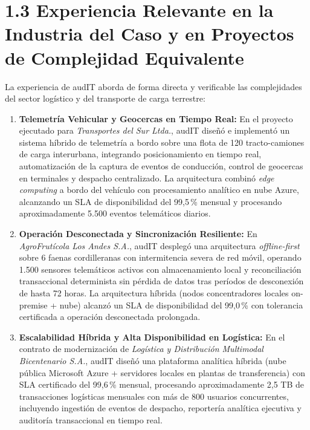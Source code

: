 \section{1.3 Experiencia Relevante en la Industria del Caso y en Proyectos de Complejidad Equivalente}

La experiencia de audIT aborda de forma directa y verificable las complejidades del sector logístico y del transporte de carga terrestre:

\begin{enumerate}
    \item \textbf{Telemetría Vehicular y Geocercas en Tiempo Real:} En el proyecto ejecutado para \emph{Transportes del Sur Ltda.}, audIT diseñó e implementó un sistema híbrido de telemetría a bordo sobre una flota de 120 tracto-camiones de carga interurbana, integrando posicionamiento en tiempo real, automatización de la captura de eventos de conducción, control de geocercas en terminales y despacho centralizado. La arquitectura combinó \emph{edge computing} a bordo del vehículo con procesamiento analítico en nube Azure, alcanzando un SLA de disponibilidad del 99,5\,\% mensual y procesando aproximadamente 5.500 eventos telemáticos diarios.
    
    \item \textbf{Operación Desconectada y Sincronización Resiliente:} En \emph{AgroFrutícola Los Andes S.A.}, audIT desplegó una arquitectura \emph{offline-first} sobre 6 faenas cordilleranas con intermitencia severa de red móvil, operando 1.500 sensores telemáticos activos con almacenamiento local y reconciliación transaccional determinista sin pérdida de datos tras períodos de desconexión de hasta 72 horas. La arquitectura híbrida (nodos concentradores locales on-premise + nube) alcanzó un SLA de disponibilidad del 99,0\,\% con tolerancia certificada a operación desconectada prolongada.
    
    \item \textbf{Escalabilidad Híbrida y Alta Disponibilidad en Logística:} En el contrato de modernización de \emph{Logística y Distribución Multimodal Bicentenario S.A.}, audIT diseñó una plataforma analítica híbrida (nube pública Microsoft Azure + servidores locales en plantas de transferencia) con SLA certificado del 99,6\,\% mensual, procesando aproximadamente 2,5 TB de transacciones logísticas mensuales con más de 800 usuarios concurrentes, incluyendo ingestión de eventos de despacho, reportería analítica ejecutiva y auditoría transaccional en tiempo real.
\end{enumerate}

